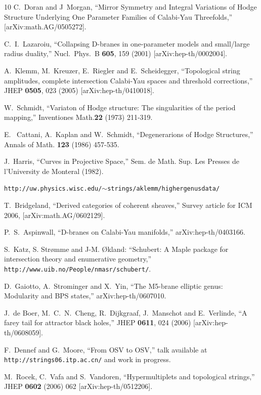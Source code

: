 \documentclass[12pt]{article}
\begin{document}
\begin{thebibliography}{10}
 C.~Doran and J~Morgan, ``Mirror Symmetry and Integral Variations of
    Hodge Structure Underlying One Parameter Families of Calabi-Yau Threefolds,'' [arXiv:math.AG/0505272].

  C.~I.~Lazaroiu,
  ``Collapsing D-branes in one-parameter models and small/large radius
   duality,''
  Nucl.\ Phys.\ B {\bf 605}, 159 (2001)
  [arXiv:hep-th/0002004].

 A.~Klemm, M.~Kreuzer, E.~Riegler and E.~Scheidegger,
  ``Topological string amplitudes, complete intersection Calabi-Yau spaces  and
  threshold corrections,''
  JHEP {\bf 0505}, 023 (2005)
  [arXiv:hep-th/0410018].

 W.~Schmidt, ``Variaton of Hodge structure: The singularities of the period mapping,''
        Inventiones Math.{\bf 22} (1973) 211-319.

 E.~ Cattani, A.~Kaplan and W.~Schmidt, ``Degenerarions of Hodge Structures,''
Annals of Math. {\bf 123} (1986)  457-535.

 J.~Harris, ``Curves in Projective Space,'' Sem. de Math. Sup. Les Presses de l'University
de Monteral (1982).

 {\tt http://uw.physics.wisc.edu/$\sim$strings/aklemm/highergenusdata/}

  T.~Bridgeland, ``Derived categories of coherent sheaves,''
Survey article for ICM 2006,  [arXiv:math.AG/0602129].

  P.~S.~Aspinwall,
  ``D-branes on Calabi-Yau manifolds,''
  arXiv:hep-th/0403166.


 S.~Katz, S. Str{\o}mme and J-M. {\O}kland: ``Schubert: A Maple package
for intersection theory and enumerative geometry,'' {\tt http://www.uib.no/People/nmasr/schubert/}.

  D.~Gaiotto, A.~Strominger and X.~Yin,
  ``The M5-brane elliptic genus: Modularity and BPS states,''
  arXiv:hep-th/0607010.

  J.~de Boer, M.~C.~N.~Cheng, R.~Dijkgraaf, J.~Manschot and E.~Verlinde,
  ``A farey tail for attractor black holes,''
  JHEP {\bf 0611}, 024 (2006)
  [arXiv:hep-th/0608059].

 F.~Dennef and G.~Moore, ``From OSV to OSV,'' talk available at
{\tt http://strings06.itp.ac.cn/} and work in progress.


  M.~Rocek, C.~Vafa and S.~Vandoren,
  ``Hypermultiplets and topological strings,''
  JHEP {\bf 0602} (2006) 062
  [arXiv:hep-th/0512206].

\end{thebibliography}
\end{document}
